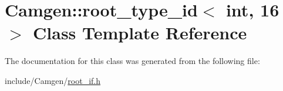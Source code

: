 \hypertarget{a00487}{}\section{Camgen\+:\+:root\+\_\+type\+\_\+id$<$ int, 16 $>$ Class Template Reference}
\label{a00487}


The documentation for this class was generated from the following file\+:\begin{DoxyCompactItemize}
\item 
include/\+Camgen/\hyperlink{a00760}{root\+\_\+if.\+h}\end{DoxyCompactItemize}
